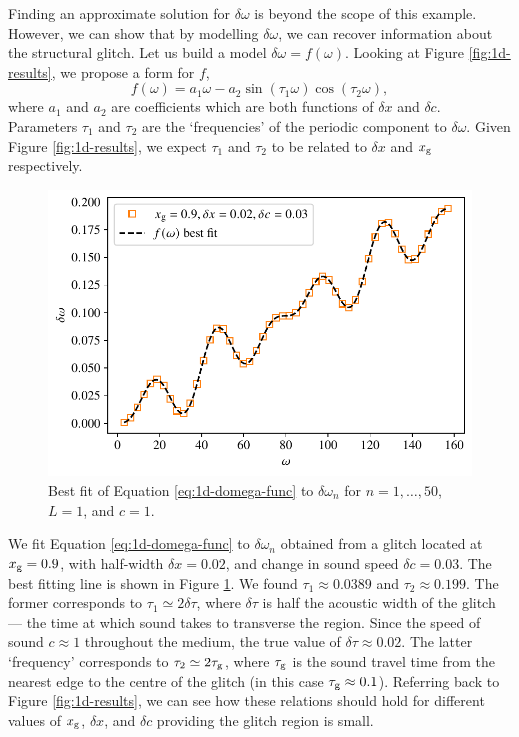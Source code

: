 Finding an approximate solution for \(\delta\omega\) is beyond the scope of this example. However, we can show that by modelling \(\delta\omega\), we can recover information about the structural glitch. Let us build a model \(\delta\omega = f(\omega)\). Looking at Figure \ref{fig:1d-results}, we propose a form for \(f\),
%
\begin{equation}
    f(\omega) = a_1 \omega - a_2 \sin (\tau_1 \omega) \cos (\tau_2 \omega), \label{eq:1d-domega-func}
\end{equation}
%
where \(a_1\) and \(a_2\) are coefficients which are both functions of \(\delta x\) and \(\delta c\). Parameters \(\tau_1\) and \(\tau_2\) are the `frequencies' of the periodic component to \(\delta\omega\). Given Figure \ref{fig:1d-results}, we expect \(\tau_1\) and \(\tau_2\) to be related to \(\delta x\) and \(x_{{\mathrm{g}}}\) respectively.

\begin{figure}[tb]
    \centering
    \includegraphics{figures/glitch-1d-fit.pdf}
    \caption{Best fit of Equation \ref{eq:1d-domega-func} to \(\delta\omega_n\) for \(n=1,\dots,50\), \(L=1\), and \(c=1\).}
    \label{fig:1d-fit}
\end{figure}

We fit Equation \ref{eq:1d-domega-func} to \(\delta\omega_n\) obtained from a glitch located at \(x_{{\mathrm{g}}} = 0.9\), with half-width \(\delta x = 0.02\), and change in sound speed \(\delta c = 0.03\). The best fitting line is shown in Figure \ref{fig:1d-fit}. We found \(\tau_1 \approx \num{0.0389}\) and \(\tau_2 \approx \num{0.199}\). The former corresponds to \(\tau_1 \simeq 2\delta\tau\), where \(\delta\tau\) is half the acoustic width of the glitch --- the time at which sound takes to transverse the region. Since the speed of sound \(c \approx \num{1}\) throughout the medium, the true value of \(\delta\tau \approx 0.02\). The latter `frequency' corresponds to \(\tau_2 \simeq 2\tau_{{\mathrm{g}}}\), where \(\tau_{{\mathrm{g}}}\) is the sound travel time from the nearest edge to the centre of the glitch (in this case \(\tau_{{\mathrm{g}}} \approx 0.1\)). Referring back to Figure \ref{fig:1d-results}, we can see how these relations should hold for different values of \(x_{{\mathrm{g}}}\), \(\delta x\), and \(\delta c\) providing the glitch region is small.

